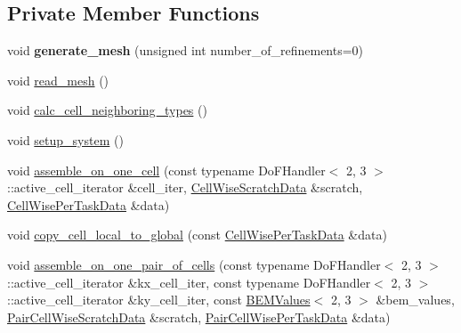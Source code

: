 \subsection*{Private Member Functions}
\begin{DoxyCompactItemize}
\item 
\mbox{\label{classLaplaceBEM_1_1Erichsen1996Efficient_1_1Example2_a4771be3ff7c2e6308e13b3d21756ff1c}} 
void {\bfseries generate\+\_\+mesh} (unsigned int number\+\_\+of\+\_\+refinements=0)
\item 
void \hyperlink{classLaplaceBEM_1_1Erichsen1996Efficient_1_1Example2_a0d5abae56e8da05aad9ade216126109a}{read\+\_\+mesh} ()
\item 
void \hyperlink{classLaplaceBEM_1_1Erichsen1996Efficient_1_1Example2_a6a47dc2d39a4a3ff6b446e43e520bde7}{calc\+\_\+cell\+\_\+neighboring\+\_\+types} ()
\item 
void \hyperlink{classLaplaceBEM_1_1Erichsen1996Efficient_1_1Example2_a7bece202baddc2ff307f19d973f744fa}{setup\+\_\+system} ()
\item 
void \hyperlink{classLaplaceBEM_1_1Erichsen1996Efficient_1_1Example2_a8fd1e4be1faa412424e1ee521c597d37}{assemble\+\_\+on\+\_\+one\+\_\+cell} (const typename Do\+F\+Handler$<$ 2, 3 $>$\+::active\+\_\+cell\+\_\+iterator \&cell\+\_\+iter, \hyperlink{structLaplaceBEM_1_1CellWiseScratchData}{Cell\+Wise\+Scratch\+Data} \&scratch, \hyperlink{structLaplaceBEM_1_1CellWisePerTaskData}{Cell\+Wise\+Per\+Task\+Data} \&data)
\item 
void \hyperlink{classLaplaceBEM_1_1Erichsen1996Efficient_1_1Example2_aafff0bc1b7690a0150ba69991d37ef26}{copy\+\_\+cell\+\_\+local\+\_\+to\+\_\+global} (const \hyperlink{structLaplaceBEM_1_1CellWisePerTaskData}{Cell\+Wise\+Per\+Task\+Data} \&data)
\item 
void \hyperlink{classLaplaceBEM_1_1Erichsen1996Efficient_1_1Example2_afe943d5681aaef439208f51dc463f173}{assemble\+\_\+on\+\_\+one\+\_\+pair\+\_\+of\+\_\+cells} (const typename Do\+F\+Handler$<$ 2, 3 $>$\+::active\+\_\+cell\+\_\+iterator \&kx\+\_\+cell\+\_\+iter, const typename Do\+F\+Handler$<$ 2, 3 $>$\+::active\+\_\+cell\+\_\+iterator \&ky\+\_\+cell\+\_\+iter, const \hyperlink{classLaplaceBEM_1_1BEMValues}{B\+E\+M\+Values}$<$ 2, 3 $>$ \&bem\+\_\+values, \hyperlink{structLaplaceBEM_1_1PairCellWiseScratchData}{Pair\+Cell\+Wise\+Scratch\+Data} \&scratch, \hyperlink{structLaplaceBEM_1_1PairCellWisePerTaskData}{Pair\+Cell\+Wise\+Per\+Task\+Data} \&data)

\end{DoxyCompactItemize}
